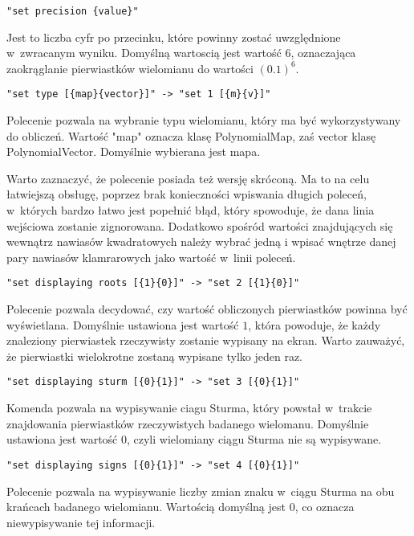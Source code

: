 \begin{lstlisting}
"set precision {value}"
\end{lstlisting}

Jest to liczba cyfr po przecinku, które powinny zostać uwzględnione w~zwracanym wyniku. Domyślną wartoscią jest wartość $6$, oznaczająca zaokrąglanie pierwiastków wielomianu do wartości $(0.1)^6$.

\begin{lstlisting}
"set type [{map}{vector}]" -> "set 1 [{m}{v}]"
\end{lstlisting}

Polecenie pozwala na wybranie typu wielomianu, który ma być wykorzystywany do obliczeń. Wartość "map" oznacza klasę PolynomialMap, zaś vector klasę PolynomialVector. Domyślnie wybierana jest mapa.

Warto zaznaczyć, że polecenie posiada też wersję skróconą. Ma to na celu łatwiejszą obsługę, poprzez brak konieczności wpiswania długich poleceń, w~których bardzo łatwo jest popełnić błąd, który spowoduje, że dana linia wejściowa zostanie zignorowana. Dodatkowo spośród wartości znajdujących się wewnątrz nawiasów kwadratowych należy wybrać jedną i wpisać wnętrze danej pary nawiasów klamrarowych jako wartość w~linii poleceń.

\begin{lstlisting}
"set displaying roots [{1}{0}]" -> "set 2 [{1}{0}]"
\end{lstlisting}
Polecenie pozwala decydować, czy wartość obliczonych pierwiastków powinna być wyświetlana. Domyślnie ustawiona jest wartość $1$, która powoduje, że każdy znaleziony pierwiastek rzeczywisty zostanie wypisany na ekran. Warto zauważyć, że pierwiastki wielokrotne zostaną wypisane tylko jeden raz.

\begin{lstlisting}
"set displaying sturm [{0}{1}]" -> "set 3 [{0}{1}]"
\end{lstlisting}

Komenda pozwala na wypisywanie ciagu Sturma, który powstał w~trakcie znajdowania pierwiastków rzeczywistych badanego wielomanu. Domyślnie ustawiona jest wartość $0$, czyli wielomiany ciągu Sturma nie są wypisywane.

\begin{lstlisting}
"set displaying signs [{0}{1}]" -> "set 4 [{0}{1}]"
\end{lstlisting}

Polecenie pozwala na wypisywanie liczby zmian znaku w~ciągu Sturma na obu krańcach badanego wielomianu. Wartością domyślną jest $0$, co oznacza niewypisywanie tej informacji.

